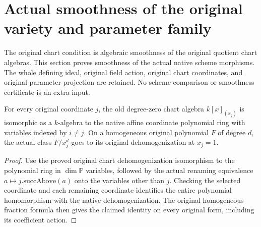\section{Actual smoothness of the original variety and parameter family}

The original chart condition is algebraic smoothness of the original
quotient chart algebras. This section proves smoothness of the actual
native scheme morphisms. The whole defining ideal, original field action,
original chart coordinates, and original parameter projection are retained.
No scheme comparison or smoothness certificate is an extra input.

\begin{lemma}
\label{lem:c0n-family-original-chart-coordinates}
\leanok
For every original coordinate $j$, the old degree-zero chart algebra
$k[x]_{(x_j)}$ is isomorphic as a $k$-algebra to the native affine coordinate
polynomial ring with variables indexed by $i\ne j$. On a homogeneous
original polynomial $F$ of degree $d$, the actual class $F/x_j^d$ goes to
its original dehomogenization at $x_j=1$.
\end{lemma}
\begin{proof}
Use the proved original chart dehomogenization isomorphism to the
polynomial ring in $\dim\mathbb P$ variables, followed by the actual
renaming equivalence $a\mapsto j.\mathrm{succAbove}(a)$ onto the variables
other than $j$. Checking the selected coordinate and each remaining
coordinate identifies the entire polynomial homomorphism with the native
dehomogenization. The original homogeneous-fraction formula then gives
the claimed identity on every original form, including its coefficient
action.
\end{proof}

